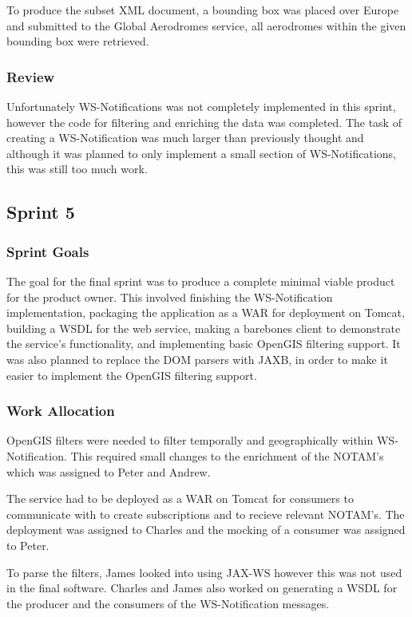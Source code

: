 \documentclass[a4paper, 12pt, twoside]{article}
\begin{document}
To produce the subset XML document, a bounding box was placed over Europe and submitted to the Global Aerodromes service, all aerodromes within the given bounding box were retrieved.

\subsubsection{Review}

Unfortunately WS-Notifications was not completely implemented in this sprint, however the code for filtering and enriching the data was completed. The task of creating a WS-Notification was much larger than previously thought and although it was planned to only implement a small section of WS-Notifications, this was still too much work.

\subsection{Sprint 5}
\label{sec:impl_sprint_5}

\subsubsection{Sprint Goals}

The goal for the final sprint was to produce a complete minimal viable product for the product owner. This involved finishing the WS-Notification implementation, packaging the application as a WAR for deployment on Tomcat, building a WSDL for the web service, making a barebones client to demonstrate the service's functionality, and implementing basic OpenGIS filtering support. It was also planned to replace the DOM parsers with JAXB, in order to make it easier to implement the OpenGIS filtering support.

\subsubsection{Work Allocation}

OpenGIS filters were needed to filter temporally and geographically within WS-Notification. This required small changes to the enrichment of the NOTAM's which was assigned to Peter and Andrew.

The service had to be deployed as a WAR on Tomcat for consumers to communicate with to create subscriptions and to recieve relevant NOTAM's. The deployment was assigned to Charles and the mocking of a consumer was assigned to Peter.

To parse the filters, James looked into using JAX-WS however this was not used in the final software. Charles and James also worked on generating a WSDL for the producer and the consumers of the WS-Notification messages.
\end{document}
